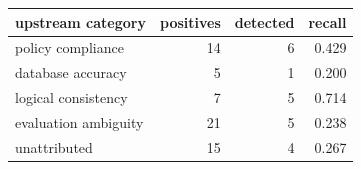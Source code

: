 \begin{tabular}{@{}lrrr@{}}
\toprule
upstream category & positives & detected & recall \\
\midrule
policy compliance & 14 & 6 & 0.429 \\
database accuracy & 5 & 1 & 0.200 \\
logical consistency & 7 & 5 & 0.714 \\
evaluation ambiguity & 21 & 5 & 0.238 \\
unattributed & 15 & 4 & 0.267 \\
\bottomrule
\end{tabular}
